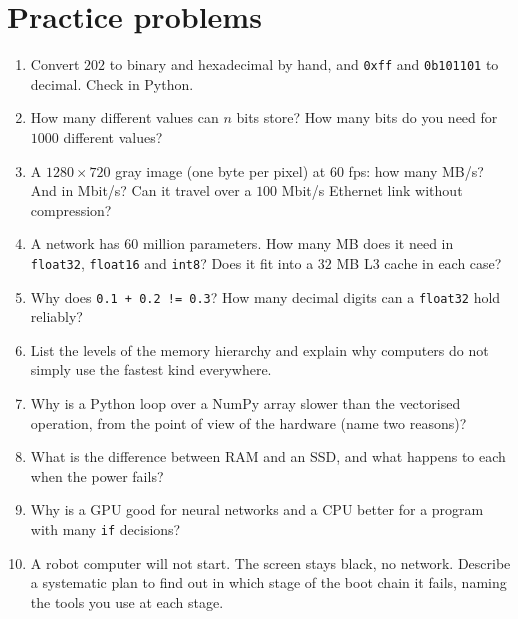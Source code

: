 \section*{Practice problems}
\begin{enumerate}[label=\textbf{\thechapter.\arabic*}]
  \item Convert $202$ to binary and hexadecimal by hand, and \texttt{0xff} and \texttt{0b101101} to decimal. Check in Python.
  \item How many different values can $n$ bits store? How many bits do you need for $1000$ different values?
  \item A $1280\times720$ gray image (one byte per pixel) at $60$ fps: how many MB/s? And in Mbit/s? Can it travel over a $100$ Mbit/s Ethernet link without compression?
  \item A network has $60$ million parameters. How many MB does it need in \texttt{float32}, \texttt{float16} and \texttt{int8}? Does it fit into a $32$ MB L3 cache in each case?
  \item Why does \texttt{0.1 + 0.2 != 0.3}? How many decimal digits can a \texttt{float32} hold reliably?
  \item List the levels of the memory hierarchy and explain why computers do not simply use the fastest kind everywhere.
  \item Why is a Python loop over a NumPy array slower than the vectorised operation, from the point of view of the hardware (name two reasons)?
  \item What is the difference between RAM and an SSD, and what happens to each when the power fails?
  \item Why is a GPU good for neural networks and a CPU better for a program with many \texttt{if} decisions?
  \item[\textbf{\thechapter.10}$\star$] A robot computer will not start. The screen stays black, no network. Describe a systematic plan to find out in which stage of the boot chain it fails, naming the tools you use at each stage.
\end{enumerate}
